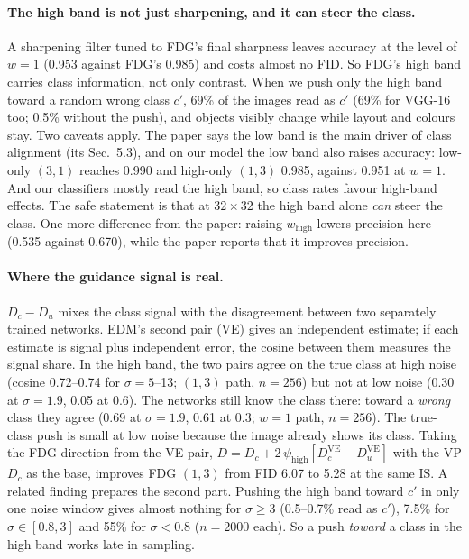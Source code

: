 \documentclass[11pt]{article}
\newcommand{\high}{\psi_{\mathrm{high}}}
\begin{document}
\paragraph{The high band is not just sharpening, and it can steer the class.} A sharpening filter tuned to FDG's
final sharpness leaves accuracy at the level of $w = 1$ (0.953 against FDG's 0.985) and costs almost no FID. So
FDG's high band carries class information, not only contrast. When we push only the high band toward a random wrong
class $c'$, 69\% of the images read as $c'$ (69\% for VGG-16 too; 0.5\% without the push), and objects visibly
change while layout and colours stay. Two caveats apply. The paper says the low band is the main driver of class
alignment (its Sec.~5.3), and on our model the low band also raises accuracy: low-only $(3,1)$ reaches 0.990 and
high-only $(1,3)$ 0.985, against 0.951 at $w = 1$. And our classifiers mostly read the high band, so class rates
favour high-band effects. The safe statement is that at $32 \times 32$ the high band alone \emph{can} steer the
class. One more difference from the paper: raising $w_{\mathrm{high}}$ lowers precision here (0.535 against 0.670),
while the paper reports that it improves precision.

\paragraph{Where the guidance signal is real.} $D_c - D_u$ mixes the class signal with the disagreement between two
separately trained networks. EDM's second pair (VE) gives an independent estimate; if each estimate is signal plus
independent error, the cosine between them measures the signal share. In the high band, the two pairs agree on the
true class at high noise (cosine 0.72--0.74 for $\sigma = 5$--13; $(1,3)$ path, $n = 256$) but not at low noise
(0.30 at $\sigma = 1.9$, 0.05 at 0.6). The networks still know the class there: toward a \emph{wrong} class they agree
(0.69 at $\sigma = 1.9$, 0.61 at 0.3; $w = 1$ path, $n = 256$). The true-class push is small at low noise because the
image already shows its class. Taking the FDG direction
from the VE pair, $D = D_c + 2\,\high[D_c^{\mathrm{VE}} - D_u^{\mathrm{VE}}]$ with the VP $D_c$ as the base, improves FDG $(1,3)$ from FID 6.07 to 5.28 at the same
IS. A related finding prepares the second part. Pushing the high band toward $c'$ in only one noise window gives
almost nothing for $\sigma \geq 3$ (0.5--0.7\% read as $c'$), 7.5\% for $\sigma \in [0.8, 3]$ and 55\% for
$\sigma < 0.8$ ($n = 2000$ each). So a push \emph{toward} a class in the high band works late in sampling.
\end{document}
